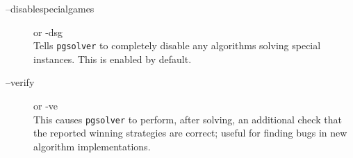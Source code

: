 \begin{description}
% 

\item[{\ttfamily --disablespecialgames}]  \enspace or {\ttfamily -dsg} \\
   Tells \texttt{pgsolver} to completely disable any algorithms solving special instances. This is enabled by default.

% 

\item[{\ttfamily --verify}]  \enspace or {\ttfamily -ve} \\
   This causes \texttt{pgsolver} to perform, after solving, an additional check that the reported winning
   strategies are correct; useful for finding bugs in new algorithm implementations.

% 


\end{description}
